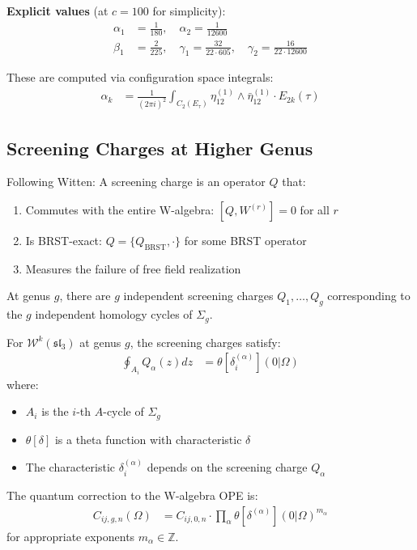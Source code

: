 \begin{example}
\textbf{Explicit values} (at $c=100$ for simplicity):
\begin{align}
\alpha_1 &= \frac{1}{180}, \quad \alpha_2 = \frac{1}{12600} \\
\beta_1 &= \frac{2}{225}, \quad \gamma_1 = \frac{32}{22 \cdot 605}, \quad \gamma_2 = \frac{16}{22 \cdot 12600}
\end{align}

These are computed via configuration space integrals:
\begin{align}
\alpha_k &= \frac{1}{(2\pi i)^2} \int_{C_2(E_\tau)} \eta_{12}^{(1)} \wedge \bar{\eta}_{12}^{(1)} \cdot E_{2k}(\tau)
\end{align}
\end{example}

\subsection{Screening Charges at Higher Genus}

\begin{definition}
Following Witten: A screening charge is an operator $Q$ that:
\begin{enumerate}
\item Commutes with the entire W-algebra: $[Q, W^{(r)}] = 0$ for all $r$
\item Is BRST-exact: $Q = \{Q_{\text{BRST}}, \cdot\}$ for some BRST operator
\item Measures the failure of free field realization
\end{enumerate}

At genus $g$, there are $g$ independent screening charges $Q_1, \ldots, Q_g$ corresponding 
to the $g$ independent homology cycles of $\Sigma_g$.
\end{definition}

\begin{theorem}
For $\mathcal{W}^k(\mathfrak{sl}_3)$ at genus $g$, the screening charges satisfy:
\begin{align}
\oint_{A_i} Q_{\alpha}(z) dz &= \theta[\delta_i^{(\alpha)}](0|\Omega)
\end{align}
where:
\begin{itemize}
\item $A_i$ is the $i$-th $A$-cycle of $\Sigma_g$
\item $\theta[\delta]$ is a theta function with characteristic $\delta$
\item The characteristic $\delta_i^{(\alpha)}$ depends on the screening charge $Q_{\alpha}$
\end{itemize}

The quantum correction to the W-algebra OPE is:
\begin{align}
C_{ij,g,n}(\Omega) &= C_{ij,0,n} \cdot \prod_{\alpha} \theta[\delta^{(\alpha)}](0|\Omega)^{m_{\alpha}}
\end{align}
for appropriate exponents $m_\alpha \in \mathbb{Z}$.
\end{theorem}

